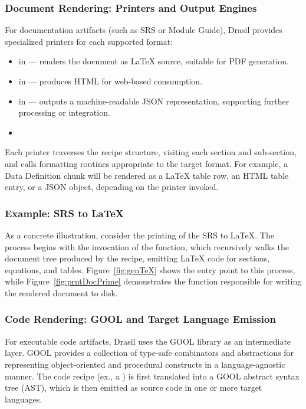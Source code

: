 \subsubsection{Document Rendering: Printers and Output Engines}
For documentation artifacts (such as SRS or Module Guide), Drasil provides 
specialized printers for each supported format:
\begin{itemize}
    \item {} in  --- renders the 
    document as \LaTeX{} source, suitable for PDF generation.
    \item {} in  --- produces 
    HTML for web-based consumption.
    \item {} in  --- outputs a 
    machine-readable JSON representation, supporting further processing or 
    integration.
	\item {}
\end{itemize}

Each printer traverses the recipe structure, visiting each section and 
sub-section, and calls formatting routines appropriate to the target format. 
For example, a Data Definition chunk will be rendered as a LaTeX table row, an 
HTML table entry, or a JSON object, depending on the printer invoked.
\subsubsection{Example: SRS to \LaTeX{}}
As a concrete illustration, consider the printing of the \gb{} SRS to 
\LaTeX{}. The process begins with the invocation of the  
function, which recursively walks the document tree produced by the recipe, 
emitting \LaTeX{} code for sections, equations, and tables. 
Figure~\ref{fig:genTeX} shows the entry point to this process, while 
Figure~\ref{fig:prntDocPrime} demonstrates the function responsible for writing 
the rendered document to disk.



\subsubsection{Code Rendering: GOOL and Target Language Emission}
For executable code artifacts, Drasil uses the GOOL library as an intermediate 
layer. GOOL provides a collection of type-safe combinators and abstractions for 
representing object-oriented and procedural constructs in a language-agnostic 
manner. The code recipe (ex., a ) is first translated into a 
GOOL abstract syntax tree (AST), which is then emitted as source code in one or 
more target languages.

